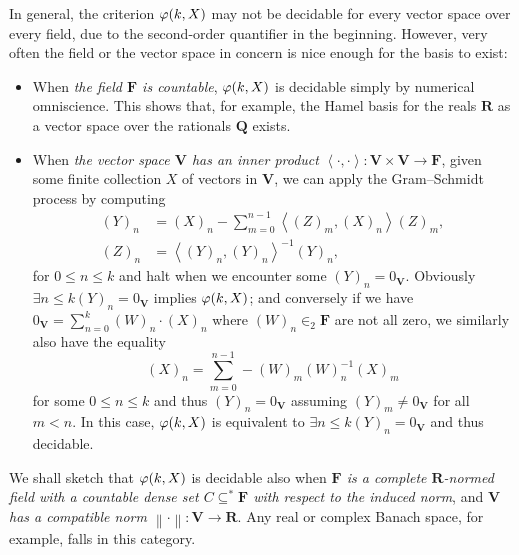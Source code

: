 \documentclass[11pt]{article}
\theoremstyle{plain}
\theoremstyle{definition}
\newcommand{\tuple}[1]{\left\langle #1 \right\rangle}
\begin{document}
In general, the criterion $\varphi\mleft(k, X\mright)$ may not be decidable for every vector space over every field, due to the second-order quantifier in the beginning. However, very often the field or the vector space in concern is nice enough for the basis to exist:
\begin{itemize}
    \item When \emph{the field $\mathbf{F}$ is countable}, $\varphi\mleft(k, X\mright)$ is decidable simply by numerical omniscience. This shows that, for example, the Hamel basis for the reals $\mathbf{R}$ as a vector space over the rationals $\mathbf{Q}$ exists.
    \item When \emph{the vector space $\mathbf{V}$ has an inner product $\tuple{\cdot, \cdot} : \mathbf{V} \times \mathbf{V} \rightarrow \mathbf{F}$}, given some finite collection $X$ of vectors in $\mathbf{V}$, we can apply the Gram--Schmidt process by computing
          \begin{align*}
              \left(Y\right)_n & = \left(X\right)_n - \sum_{m = 0}^{n - 1} \tuple{\left(Z\right)_m, \left(X\right)_n} \left(Z\right)_m, \\
              \left(Z\right)_n & = \tuple{\left(Y\right)_n, \left(Y\right)_n}^{-1} \left(Y\right)_n,
          \end{align*}
          for $0 \leq n \leq k$ and halt when we encounter some $\left(Y\right)_n = 0_\mathbf{V}$. Obviously $\exists n \leq k \left(Y\right)_n = 0_\mathbf{V}$ implies $\varphi\mleft(k, X\mright)$; and conversely if we have $0_\mathbf{V} = \sum_{n = 0}^k \left(W\right)_n \cdot \left(X\right)_n$ where $\left(W\right)_n \in_2 \mathbf{F}$ are not all zero, we similarly also have the equality
          \[\left(X\right)_n = \sum_{m = 0}^{n - 1} - \left(W\right)_m \left(W\right)_n^{-1} \left(X\right)_m\]
          for some $0 \leq n \leq k$ and thus $\left(Y\right)_n = 0_\mathbf{V}$ assuming $\left(Y\right)_m \neq 0_\mathbf{V}$ for all $m < n$. In this case, $\varphi\mleft(k, X\mright)$ is equivalent to $\exists n \leq k \left(Y\right)_n = 0_\mathbf{V}$ and thus decidable.
\end{itemize}

We shall sketch that $\varphi\mleft(k, X\mright)$ is decidable also when \emph{$\mathbf{F}$ is a complete $\mathbf{R}$-normed field with a countable dense set $C \subseteq^* \mathbf{F}$ with respect to the induced norm}, and \emph{$\mathbf{V}$ has a compatible norm $\left\|\cdot\right\| : \mathbf{V} \rightarrow \mathbf{R}$}. Any real or complex Banach space, for example, falls in this category.
\end{document}
